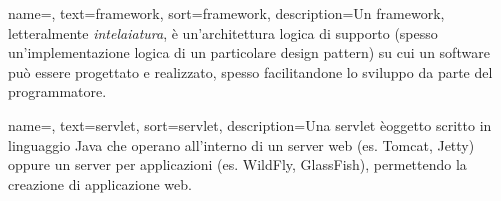 {name=,
	text=framework,
	sort=framework,
	description={Un framework, letteralmente \emph{intelaiatura}, è un'architettura logica di supporto (spesso un'implementazione logica di un particolare design pattern) su cui un software può essere progettato e realizzato, spesso facilitandone lo sviluppo da parte del programmatore.}
}

{name=,
	text=servlet,
	sort=servlet,
	description={Una servlet èoggetto scritto in linguaggio Java che operano all'interno di un server web (es. Tomcat, Jetty) oppure un server per applicazioni (es. WildFly, GlassFish), permettendo la creazione di applicazione web.}
}